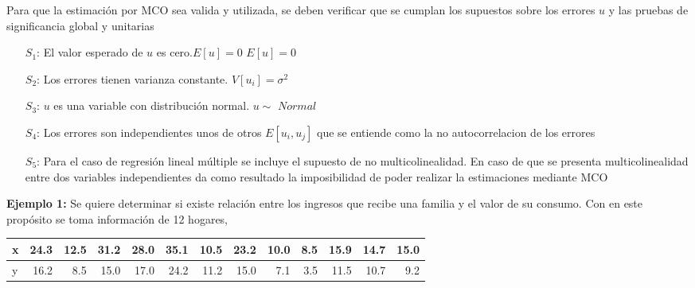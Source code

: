 \documentclass[base=hide,12pt]{elegantbook}
\begin{document}
Para que la estimación por MCO sea valida y utilizada, se deben verificar que se cumplan los supuestos sobre los errores $u$ y las pruebas de significancia global y unitarias\\


\begin{itemize}
	\item[$S_1$:] El valor esperado de $u$ es cero.$E[u]=0$\vspace{.3cm} $E[u]=0$
	\item[$S_2$:] Los errores tienen varianza constante.\hspace{.3cm} $V[u_{i}]=\sigma^{2}$
	\item[$S_3$:] $u$ es una variable con distribución normal.\hspace{.3cm} $u \sim$ $Normal$
	\item[$S_4$:] Los errores son independientes unos de otros\hspace{.3cm} $E[u_i,u_j]$ que se entiende como la no autocorrelacion de los errores 
	\item[$S_5$:] Para el caso de regresión lineal múltiple se incluye el supuesto de no multicolinealidad. En caso de que se presenta multicolinealidad entre dos variables independientes da como resultado la  imposibilidad de poder realizar la estimaciones mediante MCO
\end{itemize}
	





	
	
\newpage
\textcolor{col3}{\bf \large Ejemplo 1:} Se quiere determinar si existe relación entre los ingresos que recibe una familia y el valor de su consumo. Con en este propósito se toma información de 12 hogares, \\

\begin{center}
	\begin{tabular}{l|rrrrrrrrrrrr} 
x & 24.3 & 12.5 & 31.2 & 28.0 & 35.1 &10.5 & 23.2 & 10.0 & 8.5 & 15.9 & 14.7 &15.0\\
\hline 
y & 16.2 &  8.5 & 15.0 & 17.0 & 24.2 &11.2 & 15.0 &  7.1 & 3.5 & 11.5 & 10.7 &9.2\\
\end{tabular}
\end{center}
\end{document}

